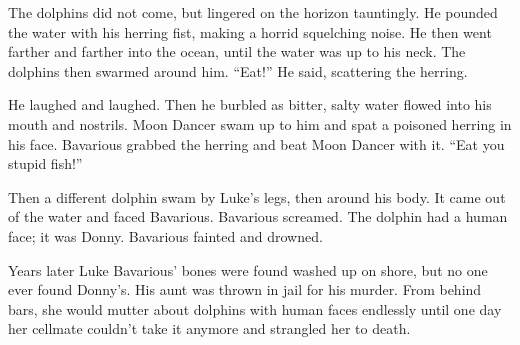 The dolphins did not come, but lingered on the horizon tauntingly.
He pounded the water with his herring fist, making a horrid
squelching noise. He then went farther and farther into the ocean,
until the water was up to his neck. The dolphins then swarmed
around him. ``Eat!'' He said, scattering the herring.



He laughed and laughed. Then he burbled as bitter, salty water
flowed into his mouth and nostrils. Moon Dancer swam up to him and
spat a poisoned herring in his face. Bavarious grabbed the herring
and beat Moon Dancer with it. ``Eat you stupid fish!''



Then a different dolphin swam by Luke's legs, then around his body.
It came out of the water and faced Bavarious. Bavarious screamed.
The dolphin had a human face; it was Donny. Bavarious fainted and
drowned.



Years later Luke Bavarious' bones were found washed up on shore,
but no one ever found Donny's. His aunt was thrown in jail for his
murder. From behind bars, she would mutter about dolphins with
human faces endlessly until one day her cellmate couldn't take it
anymore and strangled her to death. 
 



